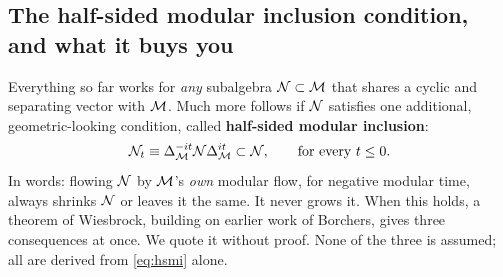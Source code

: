 \subsection*{The half-sided modular inclusion condition, and what it buys you}

Everything so far works for \emph{any} subalgebra $\mathcal{N}\subset\mathcal{M}$ that shares a cyclic and separating vector with
$\mathcal{M}$. Much more follows if $\mathcal{N}$ satisfies one additional, geometric-looking condition, called
\textbf{half-sided modular inclusion}:
\begin{equation}
\mathcal{N}_t \equiv \Delta_{\mathcal{M}}^{-it}\mathcal{N}\Delta_{\mathcal{M}}^{it} \subset \mathcal{N}, \qquad \text{for every } t\le0 .
\label{eq:hsmi}
\end{equation}
In words: flowing $\mathcal{N}$ by $\mathcal{M}$'s \emph{own} modular flow, for negative modular time, always shrinks $\mathcal{N}$ or
leaves it the same. It never grows it. When this holds, a theorem of Wiesbrock, building on earlier work of
Borchers, gives three consequences at once. We quote it without proof. None of the three is assumed; all are
derived from \eqref{eq:hsmi} alone.

